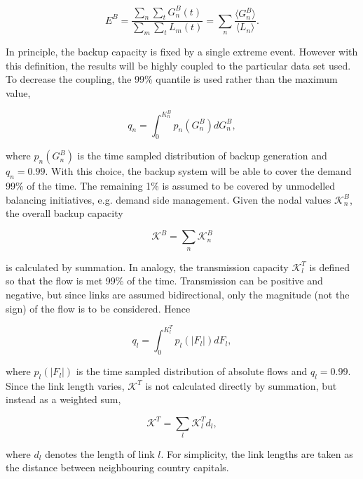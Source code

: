\documentclass[a4paper, 5p, sort&compress]{elsarticle}%
\begin{document}
\begin{equation}
  \label{eq:backup-energy}
  E^{B} =\frac{\sum_{n} \sum_{t} G^{B}_{n}(t)}{\sum_{m} \sum_{t}
    L_{m}(t)} = \sum_{n} \frac{\langle G^{B}_{n} \rangle}{\langle L_{n}
    \rangle} .
\end{equation}

In principle, the backup capacity is fixed by a single extreme
event. However with this definition, the results will be highly
coupled to the particular data set used. To decrease the coupling, the
99\% quantile is used rather than the maximum value,

\begin{equation}
  \label{eq:2}
  q_{n} = \int _{0} ^{K_{n}^{B}} p_{n}(G^{B}_{n})dG^{B}_{n},
\end{equation}

where $p_{n}(G^{B}_{n})$ is the time sampled distribution of backup
generation and $q_{n} = 0.99$. With this choice, the backup system
will be able to cover the demand 99\% of the time. The remaining 1\%
is assumed to be covered by unmodelled balancing initiatives,
e.g. demand side management. Given the nodal values
$\mathcal{K}^{B}_{n}$, the overall backup capacity

\begin{equation}
  \label{eq:4}
  \mathcal{K}^{B} = \sum_{n} \mathcal{K}^{B}_{n}
\end{equation}

is calculated by summation. In analogy, the transmission capacity $\mathcal{K}^{T}_{l}$ is defined
so that the flow is met 99\% of the time. Transmission can be
positive and negative, but since links are assumed bidirectional, only
the magnitude (not the sign) of the flow is to be considered. Hence

\begin{equation}
  \label{eq:link-cap}
  q_{l} = \int _{0} ^{K_{l}^{T}} p_{l}(|F_{l}|)dF_{l},
\end{equation}

where $p_{l}(|F_{l}|)$ is the time sampled distribution of absolute
flows and $q_{l} = 0.99$. Since the link length varies,
$\mathcal{K}^{T}$ is not calculated directly by summation, but instead
as a weighted sum,

\begin{equation}
  \label{eq:4}
  \mathcal{K}^{T} = \sum_{l} \mathcal{K}^{T}_{l} d_{l},
\end{equation}

where $d_{l}$ denotes the length of link $l$. For simplicity, the link
lengths are taken as the distance between neighbouring country
capitals. %
\end{document}
